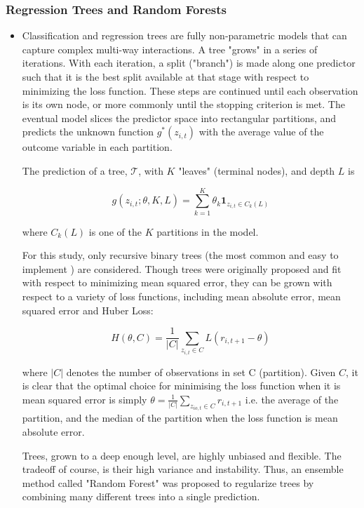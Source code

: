 \documentclass{beamer}
\begin{document}
\begin{frame}
\frametitle{Regression Trees and Random Forests}
\begin{itemize}
	\item Classification and regression trees are fully non-parametric models that can capture complex multi-way interactions. A tree "grows" in a series of iterations. With each iteration, a split ("branch") is made along one predictor such that it is the best split available at that stage with respect to minimizing the loss function. These steps are continued until each observation is its own node, or more commonly until the stopping criterion is met. The eventual model slices the predictor space into rectangular partitions, and predicts the unknown function $g^*(z_{i,t})$ with the average value of the outcome variable in each partition.
	
	The prediction of a tree, $\mathcal{T}$, with \(K\) "leaves" (terminal nodes), and depth $L$ is
	
	\begin{equation}
	g(z_{i,t};\theta,K,L) = \sum_{k=1}^{K}\theta_k\textbf{1}_{z_{i,t}\in C_k(L)}
	\end{equation}
	
	where $C_k(L)$ is one of the $K$ partitions in the model.
	
	For this study, only recursive binary trees (the most common and easy to implement ) are considered. Though trees were originally proposed and fit with respect to minimizing mean squared error, they can be grown with respect to a variety of loss functions, including mean absolute error, mean squared error and Huber Loss:
	
	\begin{equation}
	H(\theta, C) = \frac{1}{|C|} \sum_{z_{i,t} \in C} L(r_{i,t+1} - \theta)
	\end{equation}
	
	where $|C|$ denotes the number of observations in set C (partition). Given $C$, it is clear that the optimal choice for minimising the loss function when it is mean squared error is simply $\theta = \frac{1}{|C|} \sum_{z_{io,t}\in C}^{ }r_{i,t+1}$ i.e. the average of the partition, and the median of the partition when the loss function is mean absolute error.
	
	Trees, grown to a deep enough level, are highly unbiased and flexible. The tradeoff of course, is their high variance and instability. Thus, an ensemble method called "Random Forest" was proposed to regularize trees by combining many different trees into a single prediction.
\end{itemize}
\end{frame}
\end{document}
